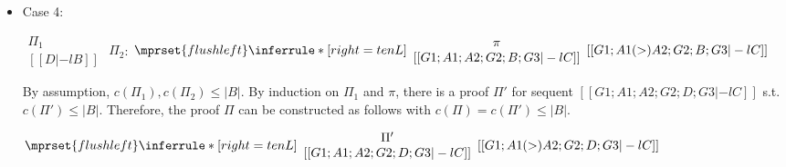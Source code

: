 \begin{itemize}
\item Case 4:
      \begin{center}
        \scriptsize
        \begin{math}
          \begin{array}{c}
            \Pi_1 \\
            {[[D |-l B]]}
          \end{array}
        \end{math}
        \qquad\qquad
        $\Pi_2$:
        \begin{math}
          $$\mprset{flushleft}
          \inferrule* [right={\tiny tenL}] {
            {
              \begin{array}{c}
                \pi \\
                {[[G1; A1; A2; G2; B; G3 |-l C]]}
              \end{array}
            }
          }{[[G1; A1 (>) A2; G2; B; G3 |-l C]]}
        \end{math}
      \end{center}
      By assumption, $c(\Pi_1),c(\Pi_2)\leq |B|$. By induction on $\Pi_1$
      and $\pi$, there is a proof $\Pi'$ for sequent
      $[[G1; A1; A2; G2; D; G3 |-l C]]$ s.t. $c(\Pi') \leq |B|$. Therefore,
      the proof $\Pi$ can be constructed as follows with
      $c(\Pi) = c(\Pi') \leq |B|$.
      \begin{center}
        \scriptsize
        \begin{math}
          $$\mprset{flushleft}
          \inferrule* [right={\tiny tenL}] {
            {
              \begin{array}{c}
                \Pi' \\
                {[[G1; A1; A2; G2; D; G3 |-l C]]}
              \end{array}
            }
          }{[[G1; A1 (>) A2; G2; D; G3 |-l C]]}
        \end{math}
      \end{center}
\end{itemize}



